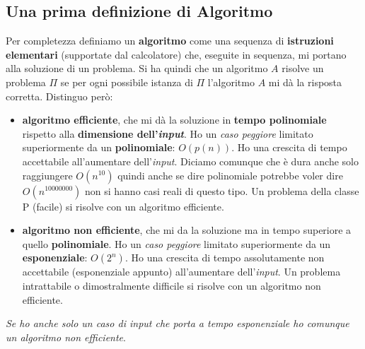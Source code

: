 \subsection{Una prima definizione di Algoritmo}
Per completezza definiamo un \textbf{algoritmo} come una sequenza di
\textbf{istruzioni elementari} (supportate dal calcolatore) che, eseguite in
sequenza, mi portano alla soluzione di un problema. Si ha quindi che un
algoritmo $A$ risolve un problema $\Pi$ se per ogni possibile istanza di $\Pi$
l'algoritmo $A$ mi dà la risposta corretta. Distinguo però:
\begin{itemize}
	\item \textbf{algoritmo efficiente}, che mi dà la soluzione in \textbf{tempo
	      polinomiale} rispetto alla \textbf{dimensione dell'\textit{input}}. Ho un
	\textit{caso peggiore} limitato superiormente da un \textbf{polinomiale}:
	$O(p(n))$. Ho una crescita di tempo accettabile all'aumentare
	dell'\textit{input}. Diciamo comunque che è dura anche solo raggiungere $O(n^{10})$
	quindi anche se dire polinomiale potrebbe voler dire $O(n^{10000000})$ non si
	hanno casi reali di questo tipo. Un problema della classe P (facile) si risolve con un algoritmo efficiente.
		  
	\item \textbf{algoritmo non efficiente}, che mi da la soluzione ma in tempo
	      superiore a quello \textbf{polinomiale}. Ho un \textit{caso peggiore} limitato
	      superiormente da un \textbf{esponenziale}: $O(2^n)$. Ho una crescita di tempo
	      assolutamente non accettabile (esponenziale appunto) all'aumentare dell'\textit{input}. Un problema intrattabile o dimostralmente difficile si risolve con un algoritmo non efficiente.
\end{itemize}
\textit{Se ho anche solo un caso di \textit{input} che porta a tempo esponenziale ho
	comunque un algoritmo non efficiente}.\\

